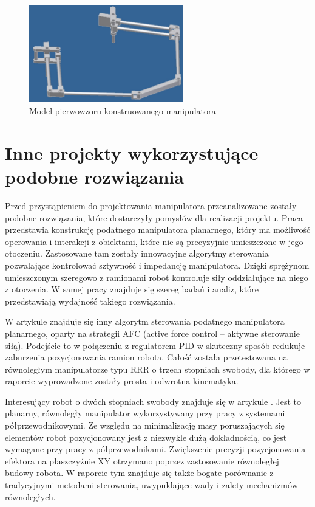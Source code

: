 \documentclass[printmode]{mgr}
\begin{document}
\begin{figure}[tp]
\centering
  \includegraphics[width=0.6\textwidth]{grafika/pierwowzor_model}
  \caption{Model pierwowzoru konstruowanego manipulatora}
  \label{rys:pierwowzor_model}  
\end{figure}


\section{Inne projekty wykorzystujące podobne rozwiązania}
Przed przystąpieniem do projektowania manipulatora przeanalizowane zostały podobne rozwiązania, które
dostarczyły pomysłów dla realizacji projektu. Praca \cite{inne1} przedstawia konstrukcję podatnego manipulatora planarnego,
który ma możliwość operowania i interakcji z obiektami, które nie są precyzyjnie umieszczone w jego otoczeniu.
Zastosowane tam zostały innowacyjne algorytmy sterowania pozwalające kontrolować sztywność i impedancję manipulatora.
Dzięki sprężynom umieszczonym szeregowo z ramionami robot kontroluje siły oddziałujące na niego z otoczenia. 
W samej pracy znajduje się szereg badań i analiz, które przedstawiają wydajność takiego rozwiązania.

W artykule \cite{inne2} znajduje się inny algorytm sterowania podatnego manipulatora planarnego, oparty na
strategii AFC (active force control -- aktywne sterowanie siłą). Podejście to w połączeniu z regulatorem PID
w skuteczny sposób redukuje zaburzenia pozycjonowania ramion robota. Całość została przetestowana na równoległym manipulatorze typu RRR
o trzech stopniach swobody, dla którego w raporcie wyprowadzone zostały prosta i odwrotna kinematyka.

Interesujący robot o dwóch stopniach swobody znajduje się w artykule \cite{inne3}. Jest to planarny, równoległy manipulator 
wykorzystywany przy pracy z systemami półprzewodnikowymi. Ze względu na minimalizację masy poruszających się elementów
robot pozycjonowany jest z niezwykle dużą dokładnością, co jest wymagane przy pracy z półprzewodnikami. Zwiększenie precyzji
pozycjonowania efektora na płaszczyźnie XY otrzymano poprzez zastosowanie równoległej budowy robota. W raporcie tym znajduje
się także bogate porównanie z tradycyjnymi metodami sterowania, uwypuklające wady i zalety mechanizmów równoległych.
\end{document}
